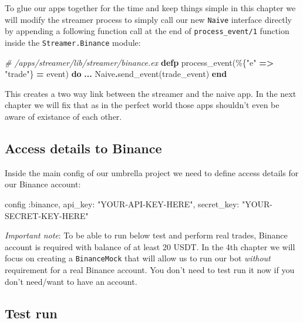 \documentclass[
]{book}
\newenvironment{Shaded}{\begin{snugshade}}{\end{snugshade}}
\newcommand{\CommentTok}[1]{\textcolor[rgb]{0.56,0.35,0.01}{\textit{#1}}}
\newcommand{\ConstantTok}[1]{\textcolor[rgb]{0.00,0.00,0.00}{#1}}
\newcommand{\KeywordTok}[1]{\textcolor[rgb]{0.13,0.29,0.53}{\textbf{#1}}}
\newcommand{\NormalTok}[1]{#1}
\newcommand{\OperatorTok}[1]{\textcolor[rgb]{0.81,0.36,0.00}{\textbf{#1}}}
\newcommand{\StringTok}[1]{\textcolor[rgb]{0.31,0.60,0.02}{#1}}
\newcommand{\VariableTok}[1]{\textcolor[rgb]{0.00,0.00,0.00}{#1}}
\begin{document}
To glue our apps together for the time and keep things simple in this chapter we will modify the streamer process to simply call our new \texttt{Naive} interface directly by appending a following function call at the end of \texttt{process\_event/1} function inside the \texttt{Streamer.Binance} module:

\begin{Shaded}
\begin{Highlighting}[]
  \CommentTok{\# /apps/streamer/lib/streamer/binance.ex}
  \KeywordTok{defp}\NormalTok{ process\_event(\%\{}\StringTok{"e"} \OperatorTok{=\textgreater{}} \StringTok{"trade"}\NormalTok{\} }\OperatorTok{=}\NormalTok{ event) }\KeywordTok{do}
    \OperatorTok{...}
    \ConstantTok{Naive}\OperatorTok{.}\NormalTok{send\_event(trade\_event)}
  \KeywordTok{end}
\end{Highlighting}
\end{Shaded}

This creates a two way link between the streamer and the naive app. In the next chapter we will fix that as in the perfect world those apps shouldn't even be aware of existance of each other.

\hypertarget{access-details-to-binance}{%
\subsection{Access details to Binance}\label{access-details-to-binance}}

Inside the main config of our umbrella project we need to define access details for our Binance account:

\begin{Shaded}
\begin{Highlighting}[]
\NormalTok{config }\VariableTok{:binance}\NormalTok{,}
  \VariableTok{api\_key:} \StringTok{"YOUR{-}API{-}KEY{-}HERE"}\NormalTok{,}
  \VariableTok{secret\_key:} \StringTok{"YOUR{-}SECRET{-}KEY{-}HERE"}
\end{Highlighting}
\end{Shaded}

\emph{Important note}: To be able to run below test and perform real trades, Binance account is required with balance of at least 20 USDT. In the 4th chapter we will focus on creating a \texttt{BinanceMock} that will allow us to run our bot \emph{without} requirement for a real Binance account. You don't need to test run it now if you don't need/want to have an account.

\hypertarget{test-run}{%
\subsection{Test run}\label{test-run}}
\end{document}
